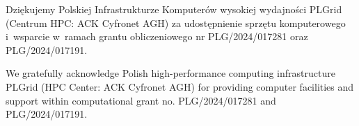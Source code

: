 \documentclass[data-science]{agh-wi} %
\begin{document}
Dziękujemy Polskiej Infrastrukturze Komputerów wysokiej wydajności PLGrid (Centrum HPC: ACK Cyfronet AGH) za udostępnienie sprzętu komputerowego i~wsparcie w~ramach grantu obliczeniowego nr PLG/2024/017281 oraz PLG/2024/017191.
\vspace*{1.5cm}

We gratefully acknowledge Polish high-performance computing infrastructure PLGrid (HPC Center: ACK Cyfronet AGH) for providing computer facilities and support within computational grant no. PLG/2024/017281 and PLG/2024/017191.


\printbibliography
\end{document}
